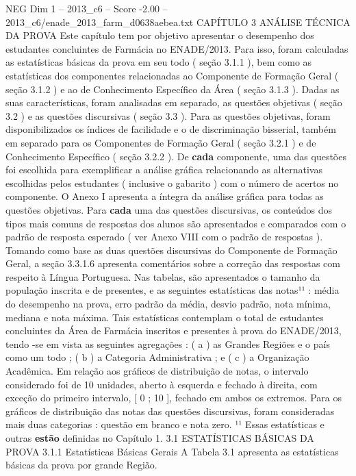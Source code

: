 \begin{textsample}{NEG Dim 1 – 2013\_c6 – Score -2.00 – 2013\_c6/enade\_2013\_farm\_d0638aebea.txt}  \label{ex:f1_neg_266}
CAPÍTULO 3 ANÁLISE TÉCNICA DA PROVA Este capítulo tem por objetivo apresentar o desempenho dos estudantes concluintes de Farmácia no ENADE/2013.
Para isso, foram calculadas as estatísticas básicas da prova em seu todo ( seção 3.1.1 ), bem como as estatísticas dos componentes relacionadas ao Componente de Formação Geral ( seção 3.1.2 ) e ao de Conhecimento Específico da Área ( seção 3.1.3 ).
Dadas as suas características, foram analisadas em separado, as questões objetivas ( seção 3.2 ) e as questões discursivas ( seção 3.3 ).
Para as questões objetivas, foram disponibilizados os índices de facilidade e o de discriminação bisserial, também em separado para os Componentes de Formação Geral ( seção 3.2.1 ) e de Conhecimento Específico ( seção 3.2.2 ).
De \textbf{cada} componente, uma das questões foi escolhida para exemplificar a análise gráfica relacionando as alternativas escolhidas pelos estudantes ( inclusive o gabarito ) com o número de acertos no componente.
O Anexo I apresenta a íntegra da análise gráfica para todas as questões objetivas.
Para \textbf{cada} uma das questões discursivas, os conteúdos dos tipos mais comuns de respostas dos alunos são apresentados e comparados com o padrão de resposta esperado ( ver Anexo VIII com o padrão de respostas ).
Tomando como base as duas questões discursivas do Componente de Formação Geral, a seção 3.3.1.6 apresenta comentários sobre a correção das respostas com respeito à Língua Portuguesa.
Nas tabelas, são apresentados o tamanho da população inscrita e de presentes, e as seguintes estatísticas das notas¹¹ : média do desempenho na prova, erro padrão da média, desvio padrão, nota mínima, mediana e nota máxima.
Tais estatísticas contemplam o total de estudantes concluintes da Área de Farmácia inscritos e presentes à prova do ENADE/2013, tendo -se em vista as seguintes agregações : ( a ) as Grandes Regiões e o país como um todo ; ( b ) a Categoria Administrativa ; e ( c ) a Organização Acadêmica.
Em relação aos gráficos de distribuição de notas, o intervalo considerado foi de 10 unidades, aberto à esquerda e fechado à direita, com exceção do primeiro intervalo, [ 0 ; 10 ], fechado em ambos os extremos.
Para os gráficos de distribuição das notas das questões discursivas, foram consideradas mais duas categorias : questão em branco e nota zero. ¹¹ Essas estatísticas e outras \textbf{estão} definidas no Capítulo 1. 3.1 ESTATÍSTICAS BÁSICAS DA PROVA 3.1.1 Estatísticas Básicas Gerais A Tabela 3.1 apresenta as estatísticas básicas da prova por grande Região.

\end{textsample}
